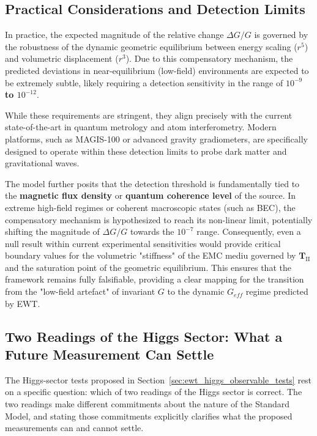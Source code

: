 \documentclass[10pt,a4paper]{article}
\begin{document}
\subsection{Practical Considerations and Detection Limits}
\label{sec:practical_considerations}
In practice, the expected magnitude of the relative change $\Delta G/G$ is governed by the robustness of the dynamic geometric equilibrium between energy scaling ($r^5$) and volumetric displacement ($r^3$). Due to this compensatory mechanism, the predicted deviations in near-equilibrium (low-field) environments are expected to be extremely subtle, likely requiring a detection sensitivity in the range of \textbf{$10^{-9}$ to $10^{-12}$}.

While these requirements are stringent, they align precisely with the current state-of-the-art in quantum metrology and atom interferometry. Modern platforms, such as MAGIS-100 or advanced gravity gradiometers, are specifically designed to operate within these detection limits to probe dark matter and gravitational waves. 

The model further posits that the detection threshold is fundamentally tied to the \textbf{magnetic flux density} or \textbf{quantum coherence level} of the source. In extreme high-field regimes or coherent macroscopic states (such as BEC), the compensatory mechanism is hypothesized to reach its non-linear limit, potentially shifting the magnitude of $\Delta G/G$ towards the $10^{-7}$ range. Consequently, even a null result within current experimental sensitivities would provide critical boundary values for the volumetric "stiffness" of the EMC mediu governed by $\mathbf{T}_{\text{II}}$ and the saturation point of the geometric equilibrium. This ensures that the framework remains fully falsifiable, providing a clear mapping for the transition from the "low-field artefact" of invariant $G$ to the dynamic $G_{eff}$ regime predicted by EWT.

\subsection{Two Readings of the Higgs Sector: What a Future Measurement Can Settle}
\label{sec:higgs_two_readings}

The Higgs-sector tests proposed in
Section~\ref{sec:ewt_higgs_observable_tests} rest on a specific
question: which of two readings of the Higgs sector is correct. The
two readings make different commitments about the nature of the
Standard Model, and stating those commitments explicitly clarifies
what the proposed measurements can and cannot settle.
\end{document}

